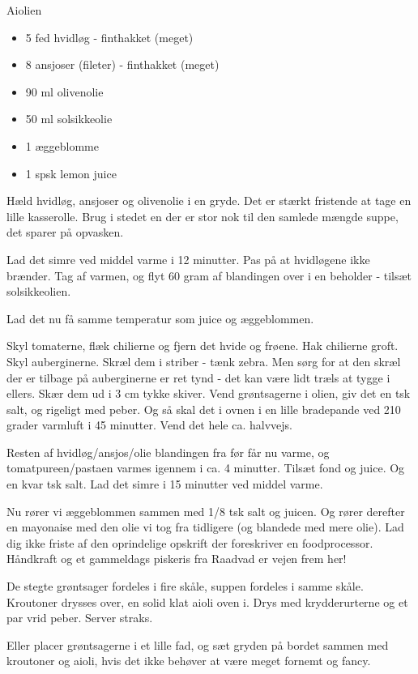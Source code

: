 \documentclass[
  letterpaper,
  DIV=11,
  numbers=noendperiod]{scrreprt}
\providecommand{\tightlist}{%
  \setlength{\itemsep}{0pt}\setlength{\parskip}{0pt}}\usepackage{longtable,booktabs,array}
\begin{document}
Aiolien

\begin{itemize}
\tightlist
\item
  5 fed hvidløg - finthakket (meget)
\item
  8 ansjoser (fileter) - finthakket (meget)
\item
  90 ml olivenolie
\item
  50 ml solsikkeolie
\item
  1 æggeblomme
\item
  1 spsk lemon juice
\end{itemize}

Hæld hvidløg, ansjoser og olivenolie i en gryde. Det er stærkt fristende
at tage en lille kasserolle. Brug i stedet en der er stor nok til den
samlede mængde suppe, det sparer på opvasken.

Lad det simre ved middel varme i 12 minutter. Pas på at hvidløgene ikke
brænder. Tag af varmen, og flyt 60 gram af blandingen over i en beholder
- tilsæt solsikkeolien.

Lad det nu få samme temperatur som juice og æggeblommen.

Skyl tomaterne, flæk chilierne og fjern det hvide og frøene. Hak
chilierne groft. Skyl auberginerne. Skræl dem i striber - tænk zebra.
Men sørg for at den skræl der er tilbage på auberginerne er ret tynd -
det kan være lidt træls at tygge i ellers. Skær dem ud i 3 cm tykke
skiver. Vend grøntsagerne i olien, giv det en tsk salt, og rigeligt med
peber. Og så skal det i ovnen i en lille bradepande ved 210 grader
varmluft i 45 minutter. Vend det hele ca. halvvejs.

Resten af hvidløg/ansjos/olie blandingen fra før får nu varme, og
tomatpureen/pastaen varmes igennem i ca. 4 minutter. Tilsæt fond og
juice. Og en kvar tsk salt. Lad det simre i 15 minutter ved middel
varme.

Nu rører vi æggeblommen sammen med 1/8 tsk salt og juicen. Og rører
derefter en mayonaise med den olie vi tog fra tidligere (og blandede med
mere olie). Lad dig ikke friste af den oprindelige opskrift der
foreskriver en foodprocessor. Håndkraft og et gammeldags piskeris fra
Raadvad er vejen frem her!

De stegte grøntsager fordeles i fire skåle, suppen fordeles i samme
skåle. Kroutoner drysses over, en solid klat aioli oven i. Drys med
krydderurterne og et par vrid peber. Server straks.

Eller placer grøntsagerne i et lille fad, og sæt gryden på bordet sammen
med kroutoner og aioli, hvis det ikke behøver at være meget fornemt og
fancy.
\end{document}
